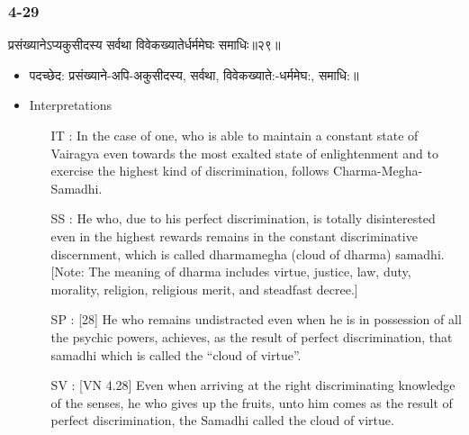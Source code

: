 \begin{frame}[fragile]\frametitle{4-29}
\begin{sanskrit}
प्रसंख्यानेऽप्यकुसीदस्य सर्वथा विवेकख्यातेर्धर्ममेघः समाधिः॥२९॥
\end{sanskrit}

	\begin{itemize}
	\item पदच्छेद:  ‌प्रसंख्याने-अपि-अकुसीदस्य, सर्वथा, विवेकख्याते:-धर्ममेघ:, समाधि:॥
	\item Interpretations
		\begin{itemize}	
		\item [IT]: In the case of one, who is able to maintain a constant state of Vairagya even towards the most exalted state of enlightenment and to exercise the highest kind of discrimination, follows Charma-Megha-Samadhi.
		\item [SS]: He who, due to his perfect discrimination, is totally disinterested even in the highest rewards remains in the constant discriminative discernment, which is called dharmamegha (cloud of dharma) samadhi. [Note: The meaning of dharma includes virtue, justice, law, duty, morality, religion, religious merit, and steadfast decree.]
		\item [SP]: [28] He who remains undistracted even when he is in possession of all the psychic powers, achieves, as the result of perfect discrimination, that samadhi which is called the “cloud of virtue”.
		\item [SV]: [VN 4.28] Even when arriving at the right discriminating knowledge of the senses, he who gives up the fruits, unto him comes as the result of perfect discrimination, the Samadhi called the cloud of virtue. 
		\end{itemize}
	\end{itemize}
\end{frame}


